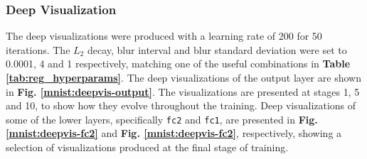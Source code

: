\subsubsection{Deep Visualization}

The deep visualizations were produced with a learning rate of 200 for 50 iterations. The $L_2$ decay, blur interval and blur standard deviation were set to 0.0001, 4 and 1 respectively, matching one of the useful combinations in \textbf{Table \ref{tab:reg_hyperparams}}. The deep visualizations of the output layer are shown in \textbf{Fig. \ref{mnist:deepvis-output}}. The visualizations are presented at stages 1, 5 and 10, to show how they evolve throughout the training. Deep visualizations of some of the lower layers, specifically \texttt{fc2} and \texttt{fc1}, are presented in \textbf{Fig. \ref{mnist:deepvis-fc2}} and \textbf{Fig. \ref{mnist:deepvis-fc2}}, respectively, showing a selection of visualizations produced at the final stage of training.

